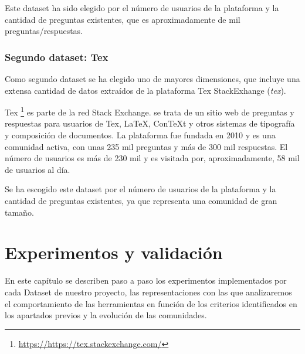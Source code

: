 \documentclass[a4paper, 12pt]{book}
\begin{document}
Este dataset ha sido elegido por el número de usuarios de la plataforma y la cantidad de preguntas existentes, que es aproximadamente de mil preguntas/respuestas. 


\subsection{Segundo dataset: Tex}
\label{sec:tex} 
Como segundo dataset se ha elegido uno de mayores dimensiones, que incluye una extensa cantidad de datos extraídos de la plataforma Tex StackExhange (\emph{tex}).

Tex \footnote{\url{https://https://tex.stackexchange.com/}} es parte de la red Stack Exchange. se trata de un sitio web de preguntas y respuestas para usuarios de Tex, LaTeX, ConTeXt y otros sistemas de tipografía y composición de documentos. La plataforma fue fundada en 2010 y es una comunidad activa, con unas 235 mil preguntas y más de 300 mil respuestas. El número de usuarios es más de 230 mil y es visitada por, aproximadamente, 58 mil de usuarios al día.

Se ha escogido este dataset por el número de usuarios de la plataforma y la cantidad de preguntas existentes, ya que representa una comunidad de gran tamaño. 

\cleardoublepage


\chapter{Experimentos y validación}
\label{chap:experimentos}

En este capítulo se describen paso a paso los experimentos implementados por cada Dataset de nuestro proyecto, las representaciones con las que analizaremos el comportamiento de las herramientas en función de los criterios identificados en los apartados previos y la evolución de las comunidades. 
\end{document}
